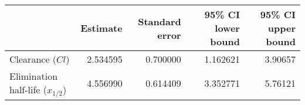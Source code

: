 \begin{tabular}{lrrrr}
\toprule
{} &  Estimate &  Standard error &  95\% CI lower bound &  95\% CI upper bound \\
\midrule
Clearance ($Cl$)                  &  2.534595 &        0.700000 &             1.162621 &              3.90657 \\
Elimination half-life ($x_{1/2}$) &  4.556990 &        0.614409 &             3.352771 &              5.76121 \\
\bottomrule
\end{tabular}
